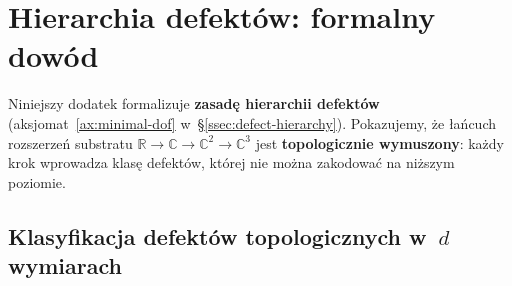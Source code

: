 \section{Hierarchia defekt\'ow: formalny dow\'od}%
\label{app:D2-defect-hierarchy}

Niniejszy dodatek formalizuje \textbf{zasad\k{e} hierarchii defekt\'ow}
(aksjomat~\ref{ax:minimal-dof} w~\S\ref{ssec:defect-hierarchy}).
Pokazujemy, \.ze \l{}a\'ncuch rozszerze\'n substratu
$\mathbb{R} \to \mathbb{C} \to \mathbb{C}^2 \to \mathbb{C}^3$
jest \textbf{topologicznie wymuszony}: ka\.zdy krok wprowadza
klas\k{e} defekt\'ow, kt\'orej nie mo\.zna zakodowa\'c na
ni\.zszym poziomie.

\medskip
\noindent{}

\subsection{Klasyfikacja defekt\'ow topologicznych w~$d$ wymiarach}%
\label{ssec:D2-classification}

